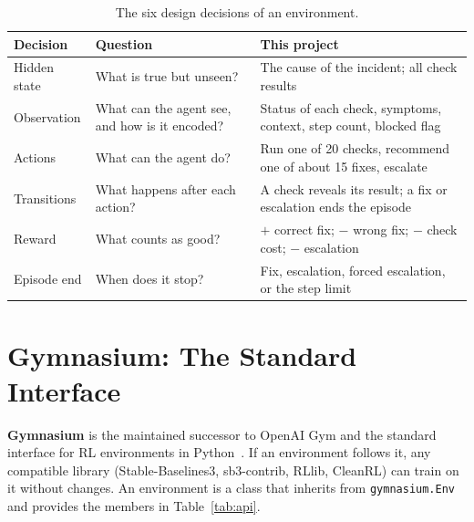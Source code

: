 \documentclass[11pt,a4paper]{article}
\begin{document}
\begin{table}[h]
\centering\small
\caption{The six design decisions of an environment.}
\label{tab:decisions}
\begin{tabularx}{\textwidth}{@{}p{2.6cm}LL@{}}
\toprule
Decision & Question & This project \\
\midrule
Hidden state & What is true but unseen? & The cause of the incident; all check results \\
Observation & What can the agent see, and how is it encoded? & Status of each check, symptoms, context, step count, blocked flag \\
Actions & What can the agent do? & Run one of 20 checks, recommend one of about 15 fixes, escalate \\
Transitions & What happens after each action? & A check reveals its result; a fix or escalation ends the episode \\
Reward & What counts as good? & $+$ correct fix; $-$ wrong fix; $-$ check cost; $-$ escalation \\
Episode end & When does it stop? & Fix, escalation, forced escalation, or the step limit \\
\bottomrule
\end{tabularx}
\end{table}

\section{Gymnasium: The Standard Interface}

\textbf{Gymnasium} is the maintained successor to OpenAI Gym and the standard interface for RL environments in Python~\cite{gymnasium}. If an environment follows it, any compatible library (Stable-Baselines3, sb3-contrib, RLlib, CleanRL) can train on it without changes. An environment is a class that inherits from \texttt{gymnasium.Env} and provides the members in Table~\ref{tab:api}.
\end{document}
